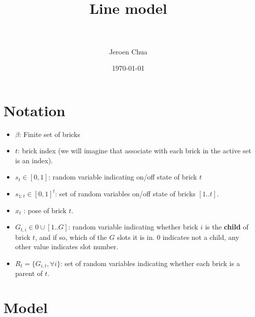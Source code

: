\documentclass[paper=a4, fontsize=11pt]{article} %
\title{	
\normalfont \normalsize 
\horrule{0.5pt} \\[0.4cm] %
\huge Line model \\ %
\horrule{2pt} \\[0.5cm] %
}
\author{Jeroen Chua} %
\date{\normalsize\today} %
\numberwithin{equation}{section} %
\numberwithin{table}{section} %
\begin{document}
\maketitle %

\section{Notation}

\begin{itemize}
\item $\beta$: Finite set of bricks
\item $t$: brick index (we will imagine that associate with each brick in the active set is an index).
\item $s_t \in [0,1]$: random variable indicating on/off state of brick $t$
\item $s_{1:t} \in [0,1]^t$: set of random variables on/off state of bricks $[1..t]$.
\item $x_t$ : pose of brick $t$.
\item $G_{t,i} \in 0 \cup [1..G] $: random variable indicating whether brick $i$ is the \textbf{child} of brick $t$, and if so, which of the $G$ slots it is in. $0$ indicates not a child, any other value indicates slot number.
\item $R_{t} = \{G_{i,t}, \forall i\}$: set of random variables indicating whether each brick is a parent of $t$.

\end{itemize}

\section{Model}








\end{document}
